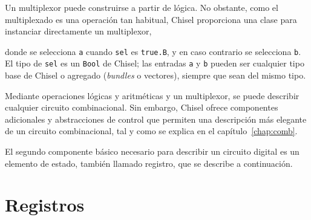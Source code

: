 \documentclass[%
    10pt,
    headinclude, footinclude=false,
    openright, %
    notitlepage,
    cleardoublepage=empty,
    headsepline,
    numbers=noenddot,
    bibliography=totoc, index=totoc,
    ]{scrbook}
\newcommand{\code}[1]{{\lstinline[basicstyle=\small\ttfamily]{#1}}}
\newcommand{\myref}[2]{\href{#1}{#2}}
\renewcommand{\myref}[2]{{#2}{\footnote{\url{#1}}}}
\begin{document}
Un multiplexor puede construirse a partir de lógica.
No obstante, como el multiplexado es una operación tan habitual, Chisel proporciona una clase para 
instanciar directamente un multiplexor,



\noindent donde se selecciona \code{a} cuando \code{sel} es \code{true.B}, y en caso contrario se
selecciona \code{b}. El tipo de \code{sel} es un \code{Bool} de Chisel; las entradas \code{a} y \code{b}
pueden ser cualquier tipo base de Chisel o agregado (\emph{bundles} o vectores), siempre que sean del
mismo tipo.


Mediante operaciones lógicas y aritméticas y un multiplexor, se puede describir cualquier
circuito combinacional. Sin embargo, Chisel ofrece componentes adicionales y abstracciones de control
que permiten una descripción más elegante de un circuito combinacional, tal y como se explica en
el capítulo~\ref{chap:comb}.


El segundo componente básico necesario para describir un circuito digital es un elemento de estado,
también llamado registro, que se describe a continuación.

\section{Registros}


\end{document}
